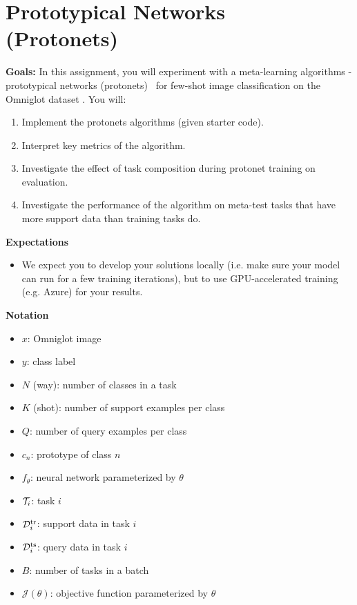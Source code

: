 \section{Prototypical Networks (Protonets)~\cite{prototypical}}

\textbf{Goals:} In this assignment, you will experiment with a meta-learning algorithms - prototypical networks (protonets)~\cite{prototypical} for few-shot image classification on the Omniglot dataset \cite{Lake1332}. You will:
\begin{enumerate}
    \item Implement the protonets algorithms (given starter code).
    \item Interpret key metrics of the algorithm.
    \item Investigate the effect of task composition during protonet training on evaluation.
    \item Investigate the performance of the algorithm on meta-test tasks that have more support data than training tasks do.
\end{enumerate}

\textbf{Expectations}
\begin{itemize}
    \item We expect you to develop your solutions locally (i.e. make sure your model can run for a few training iterations), but to use GPU-accelerated training (e.g. Azure) for your results.
\end{itemize}

\textbf{Notation}
\begin{itemize}
    \item $x$: Omniglot image
    \item $y$: class label
    \item $N$ (way): number of classes in a task
    \item $K$ (shot): number of support examples per class
    \item $Q$: number of query examples per class
    \item $c_n$: prototype of class $n$
    \item $f_\theta$: neural network parameterized by $\theta$
    \item $\mathcal{T}_i$: task $i$
    \item $\mathcal{D}^\mathrm{tr}_i$: support data in task $i$
    \item $\mathcal{D}^\mathrm{ts}_i$: query data in task $i$
    \item $B$: number of tasks in a batch
    \item $\mathcal{J}(\theta)$: objective function parameterized by $\theta$
\end{itemize}

